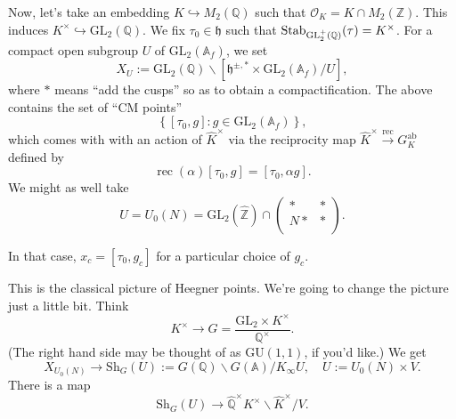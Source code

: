 \documentclass[reqno]{amsart} 
\begin{document}
Now, let's take an embedding $K \hookrightarrow M_2(\mathbb{Q})$ such that $\mathcal{O}_K = K \cap M_2(\mathbb{Z})$.  This induces $K^\times \hookrightarrow \mathrm{GL}_2(\mathbb{Q})$.  We fix $\tau_0 \in \mathfrak{h}$ such that $\operatorname{Stab}_{\mathrm{GL}_2^+(\mathbb{Q})}(\tau) = K^\times$.  For a compact open subgroup $U$ of $\mathrm{GL}_2(\mathbb{A}_f)$, we set
\begin{equation*}
  X_U := \mathrm{GL}_2(\mathbb{Q}) \backslash[\mathfrak{h}^{\pm, \ast} \times \mathrm{GL}_2(\mathbb{A}_f) / U],
\end{equation*}
where $\ast$ means ``add the cusps'' so as to obtain a compactification.    The above contains the set of ``CM points''
\begin{equation*}
  \left\{[\tau_0, g] : g \in \mathrm{GL}_2(\mathbb{A}_f) \right\},
\end{equation*}
which comes with with an action of $\hat{K}^\times$ via the reciprocity map $\hat{K}^\times \xrightarrow{\mathrm{rec}} G_K^{\mathrm{ab}}$ defined by
\begin{equation*}
  \operatorname{rec}(\alpha)[\tau_0, g]
  =[\tau_0, \alpha g].
\end{equation*}
We might as well take
\begin{equation*}
  U = U_0(N) = \mathrm{GL}_2(\hat{\mathbb{Z}}) \cap
  \begin{pmatrix}
    \ast    & \ast \\
    N \ast            &  \ast \\
  \end{pmatrix}.
\end{equation*}

In that case, $x_c =[\tau_0, g_c]$ for a particular choice of $g_c$.

This is the classical picture of Heegner points.  We're going to change the picture just a little bit.  Think
\begin{equation*}
  K^\times \rightarrow G = \frac{\mathrm{GL}_2 \times K^\times}{\mathbb{Q}^\times}.
\end{equation*}
(The right hand side may be thought of as $\mathrm{GU}(1, 1)$, if you'd like.)  We get
\begin{equation*}
  X_{U_0(N)} \rightarrow
  \mathrm{S h}_G(U) := G(\mathbb{Q}) \backslash G(\mathbb{A}) / K_\infty U, \quad U := U_0(N) \times V.
\end{equation*}
There is a map
\begin{equation*}
  \mathrm{S h}_G(U) \rightarrow \hat{\mathbb{Q}}^\times K^\times \backslash \hat{K}^\times / V.
\end{equation*}









{} 
\end{document}
